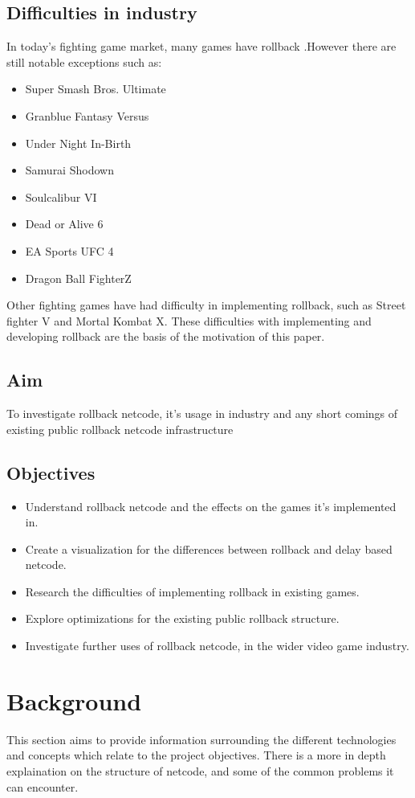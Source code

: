 \documentclass{entcs}
\begin{document}
\subsection{Difficulties in industry}
In today's fighting game market, many games have rollback \cite{GamesWithRollback}.However there are still notable exceptions such as:
\begin{itemize}
\item Super Smash Bros. Ultimate\cite{SSBU}
\item Granblue Fantasy Versus\cite{GBFV}
\item Under Night In-Birth\cite{UNI}
\item Samurai Shodown\cite{SamSho}
\item Soulcalibur VI\cite{SVI}
\item Dead or Alive 6\cite{DOA6}
\item EA Sports UFC 4\cite{UFC4}
\item Dragon Ball FighterZ\cite{DBFZ}
\end{itemize}

Other fighting games have had difficulty in implementing rollback, such as Street fighter V and Mortal Kombat X.
These difficulties with implementing and developing rollback are the basis of the motivation of this paper.

\subsection{Aim}
To investigate rollback netcode, it's usage in industry and any short comings of existing public rollback netcode infrastructure
\subsection{Objectives}
\begin{itemize}
\item Understand rollback netcode and the effects on the games it's implemented in.
\item Create a visualization for the differences between rollback and delay based netcode.
\item Research the difficulties of implementing rollback in existing games.
\item Explore optimizations for the existing public rollback structure.
\item Investigate further uses of rollback netcode, in the wider video game industry.
\end{itemize}
\newpage
\section{Background}
This section aims to provide information surrounding the different technologies and
concepts which relate to the project objectives. There is a more in depth explaination on the structure of netcode, and some of the common problems it can encounter.
\end{document}
